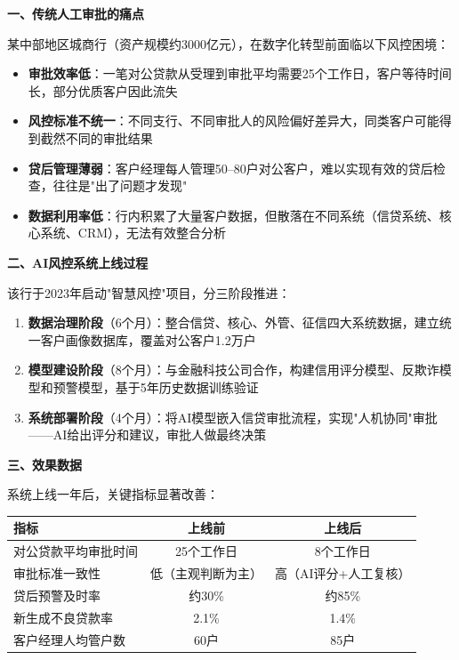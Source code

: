 \begin{casebox}[某城商行的风控升级之路]

\textbf{一、传统人工审批的痛点}

某中部地区城商行（资产规模约3000亿元），在数字化转型前面临以下风控困境：

\begin{itemize}[leftmargin=2em]
  \item \textbf{审批效率低}：一笔对公贷款从受理到审批平均需要25个工作日，客户等待时间长，部分优质客户因此流失
  \item \textbf{风控标准不统一}：不同支行、不同审批人的风险偏好差异大，同类客户可能得到截然不同的审批结果
  \item \textbf{贷后管理薄弱}：客户经理每人管理50--80户对公客户，难以实现有效的贷后检查，往往是"出了问题才发现"
  \item \textbf{数据利用率低}：行内积累了大量客户数据，但散落在不同系统（信贷系统、核心系统、CRM），无法有效整合分析
\end{itemize}

\textbf{二、AI风控系统上线过程}

该行于2023年启动"智慧风控"项目，分三阶段推进：

\begin{enumerate}[leftmargin=2em]
  \item \textbf{数据治理阶段}（6个月）：整合信贷、核心、外管、征信四大系统数据，建立统一客户画像数据库，覆盖对公客户1.2万户
  \item \textbf{模型建设阶段}（8个月）：与金融科技公司合作，构建信用评分模型、反欺诈模型和预警模型，基于5年历史数据训练验证
  \item \textbf{系统部署阶段}（4个月）：将AI模型嵌入信贷审批流程，实现"人机协同"审批——AI给出评分和建议，审批人做最终决策
\end{enumerate}

\textbf{三、效果数据}

系统上线一年后，关键指标显著改善：

\begin{table}[H]
\centering
\begin{tabular}{lcc}
\toprule
\textbf{指标} & \textbf{上线前} & \textbf{上线后} \\
\midrule
对公贷款平均审批时间 & 25个工作日 & 8个工作日 \\
审批标准一致性 & 低（主观判断为主） & 高（AI评分+人工复核） \\
贷后预警及时率 & 约30\% & 约85\% \\
新生成不良贷款率 & 2.1\% & 1.4\% \\
客户经理人均管户数 & 60户 & 85户 \\
\end{tabular}
\end{table}


\end{casebox}
